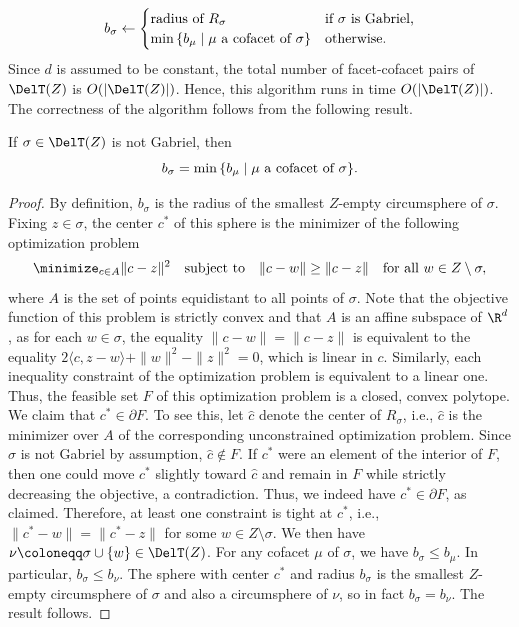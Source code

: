 \[
b_\sigma \leftarrow
\begin{cases}
\textup{radius of } R_{\sigma} & \text{if } \sigma \text{ is Gabriel,} \\
\min\, \{ b_\mu\mid \mu \text{ a cofacet of } \sigma\} & \text{otherwise.}
\end{cases}
\]
Since $d$ is assumed to be constant, the total number of facet-cofacet pairs of $\DelT(Z)$ is $O(|\DelT(Z)|)$.  Hence, this algorithm runs in time $O(|\DelT(Z)|)$.  The correctness of the algorithm follows from the following result.
%
\begin{proposition} \label{Prop:Del_Rad_Coface_Formula}
If $\sigma \in \DelT(Z)$ is not Gabriel, then \[b_\sigma = \min\, \{ b_\mu\mid \mu \textup{ a cofacet of } \sigma\}.\]
\end{proposition}
%
\begin{proof}
By definition, $b_{\sigma}$ is the radius of the smallest $Z$-empty circumsphere of $\sigma$.  Fixing $z\in \sigma$, the center $c^*$ of this sphere is the minimizer of the following optimization problem \[
\minimize_{c \in A} \|c - z\|^2 \quad \text{subject to} \quad \|c - w\| \geq \|c - z\| \quad \text{for all } w \in Z \setminus \sigma,
\] 
where $A$ is the set of points equidistant to all points of $\sigma$.   Note that the objective function of this problem is strictly convex and that $A$ is an affine subspace of $\R^d$, as for each $w\in \sigma$, the equality $\|c - w\| = \|c - z\|$ is equivalent to the equality $2\langle c, z- w \rangle+ \|w\|^2 - \|z\|^2  = 0$, which is linear in $c$.  Similarly, each inequality constraint of the optimization problem is equivalent to a linear one.  Thus, the feasible set $F$ of this optimization problem is a closed, convex polytope.    
%
We claim that $c^*\in \partial F$. To see this, let $\hat c$ denote the center of $R_{\sigma}$, i.e., $\hat c$ is the minimizer over $A$ of the corresponding unconstrained optimization problem.  Since $\sigma$ is not Gabriel by assumption, $\hat c\not \in F$.   If $c^*$ were an element of the interior of $F$, then one could move $c^*$ slightly toward $\hat c$ and remain in $F$ while strictly decreasing the objective, a contradiction.  Thus, we indeed have $c^*\in \partial F$, as claimed.  Therefore, at least one constraint is tight at $c^*$, i.e., $\|c^* - w\| = \|c^* - z\|$ for some $w \in Z \setminus \sigma$.  We then have $\nu\coloneqq \sigma\cup \{w\}\in \DelT(Z)$.
%
For any cofacet $\mu$ of $\sigma$, we have  $b_{\sigma}\leq b_{\mu}$.  In particular, $b_{\sigma}\leq b_{\nu}$.  The sphere with center $c^*$ and radius $b_{\sigma}$ is the smallest $Z$-empty circumsphere of $\sigma$ and also a circumsphere of $\nu$, so in fact $ b_{\sigma}=b_{\nu}$.  The result follows.
\end{proof}
%
%

